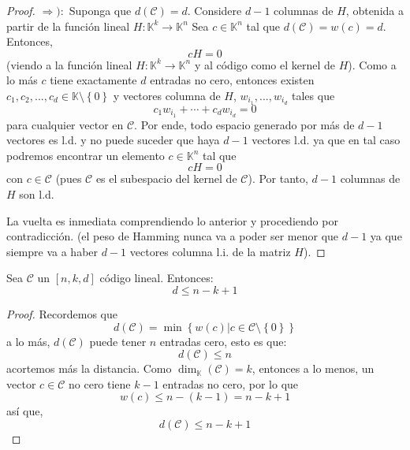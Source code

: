 \documentclass[12pt]{report}
\theoremstyle{largebreak}
\newcommand\cf[3]{\ensuremath{#1:#2\rightarrow#3}}
\begin{document}
    \begin{proof}
        $\Rightarrow):$ Suponga que $d(\mathcal{C})=d$. Considere $d-1$ columnas de $H$, obtenida a partir de la función lineal $\cf{H}{\mathbb{K}^k}{\mathbb{K}^n}$
        Sea $c\in\mathbb{K}^n$ tal que $d(\mathcal{C})=w(c)=d$. Entonces,
        \begin{equation*}
            cH=0
        \end{equation*}
        (viendo a la función lineal $\cf{H}{\mathbb{K}^k}{\mathbb{K}^n}$ y al código como el kernel de $H$). Como a lo más $c$ tiene exactamente $d$ entradas no cero, entonces existen $c_1,c_2,...,c_d\in\mathbb{K}\setminus\left\{0\right\}$ y vectores columna de $H$, $w_{ i_1},...,w_{ i_d}$ tales que
        \begin{equation*}
            c_1w_{ i_1}+\cdots+c_dw_{ i_d}=0
        \end{equation*}
        para cualquier vector en $\mathcal{C}$. Por ende, todo espacio generado por más de $d-1$ vectores es l.d. y no puede suceder que haya $d-1$ vectores l.d. ya que en tal caso podremos encontrar un elemento $c\in\mathbb{K}^n$ tal que
        \begin{equation*}
            cH=0
        \end{equation*}
        con $c\in\mathcal{C}$ (pues $\mathcal{C}$ es el subespacio del kernel de $\mathcal{C}$). Por tanto, $d-1$ columnas de $H$ son l.d.

        La vuelta es inmediata comprendiendo lo anterior y procediendo por contradicción. (el peso de Hamming nunca va a poder ser menor que $d-1$ ya que siempre va a haber $d-1$ vectores columna l.i. de la matriz $H$).
    \end{proof}

    \begin{excer}
        Sea $\mathcal{C}$ un $[n,k,d]$ código lineal. Entonces:
        \begin{equation*}
            d\leq n-k+1
        \end{equation*}
    \end{excer}

    \begin{proof}
        Recordemos que
        \begin{equation*}
            d(\mathcal{C})=\min\left\{w(c)\Big|c\in\mathcal{C}\setminus\left\{0\right\} \right\}
        \end{equation*}
        a lo más, $d(\mathcal{C})$ puede tener $n$ entradas cero, esto es que:
        \begin{equation*}
            d(\mathcal{C})\leq n
        \end{equation*}
        acortemos más la distancia. Como $\dim_{\mathbb{K}}(\mathcal{C})=k$, entonces a lo menos, un vector $c\in\mathcal{C}$ no cero tiene $k-1$ entradas no cero, por lo que
        \begin{equation*}
            w(c)\leq n-(k-1)=n-k+1
        \end{equation*}
        así que,
        \begin{equation*}
            d(\mathcal{C})\leq n-k+1
        \end{equation*}
    \end{proof}
\end{document}
